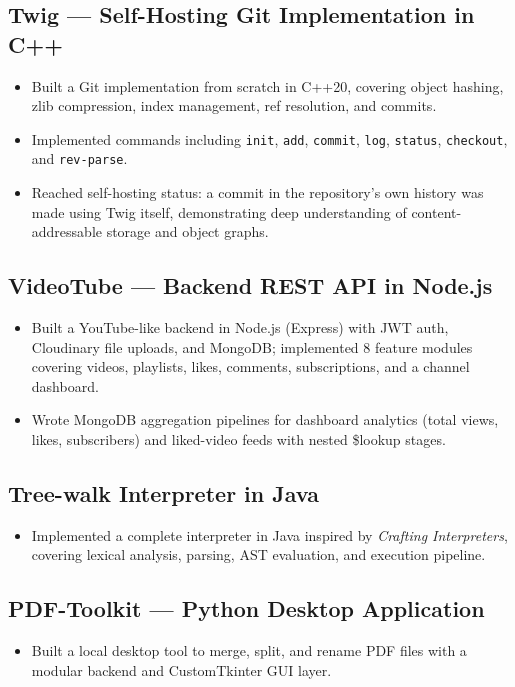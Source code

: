 \documentclass[10pt]{article}
\begin{document}
\subsection*{Twig --- Self-Hosting Git Implementation in C++}
\begin{itemize}[noitemsep]
    \item Built a Git implementation from scratch in C++20, covering object hashing, zlib compression, index management, ref resolution, and commits.
    \item Implemented commands including \texttt{init}, \texttt{add}, \texttt{commit}, \texttt{log}, \texttt{status}, \texttt{checkout}, and \texttt{rev-parse}.
    \item Reached self-hosting status: a commit in the repository's own history was made using Twig itself, demonstrating deep understanding of content-addressable storage and object graphs.
\end{itemize}

\subsection*{VideoTube --- Backend REST API in Node.js}
\begin{itemize}[noitemsep]
    \item Built a YouTube-like backend in Node.js (Express) with JWT auth, 
    Cloudinary file uploads, and MongoDB; implemented 8 feature modules 
    covering videos, playlists, likes, comments, subscriptions, and a 
    channel dashboard.
    \item Wrote MongoDB aggregation pipelines for dashboard analytics 
    (total views, likes, subscribers) and liked-video feeds with nested 
    \$lookup stages.
\end{itemize}

\subsection*{Tree-walk Interpreter in Java}
\begin{itemize}[noitemsep]
    \item Implemented a complete interpreter in Java inspired by \textit{Crafting Interpreters}, covering lexical analysis, parsing, AST evaluation, and execution pipeline.
\end{itemize}

\subsection*{PDF-Toolkit --- Python Desktop Application}
\begin{itemize}[noitemsep]
    \item Built a local desktop tool to merge, split, and rename PDF files with a modular backend and CustomTkinter GUI layer.
\end{itemize}
\end{document}
